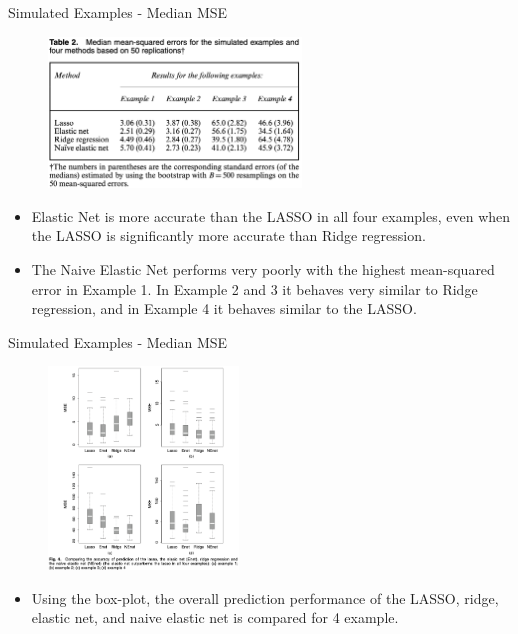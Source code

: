     \begin{frame}{Simulated Examples - Median MSE}
        \begin{figure}
            \centering
            \includegraphics[width=0.6\textwidth]{img/Table 2.png}
            \label{fig:enter-label}
        \end{figure}
        \begin{itemize}
            \item Elastic Net is more accurate than the LASSO in all four examples, even when the LASSO is significantly more accurate than Ridge regression.
            \item The Naive Elastic Net performs very poorly with the highest mean-squared error in Example 1. In Example 2 and 3 it behaves very similar to Ridge regression, and in Example 4 it behaves similar to the LASSO.
        \end{itemize}
    \end{frame}

    \begin{frame}{Simulated Examples - Median MSE}
        \begin{figure}
            \centering
            \includegraphics[width=0.45\textwidth]{img/Fig 4.png}
            \label{fig:enter-label}
        \end{figure}
        \begin{itemize}
            \item Using the box-plot, the overall prediction performance of the LASSO, ridge, elastic net, and naive elastic net is compared for 4 example.
        \end{itemize}
    \end{frame}

